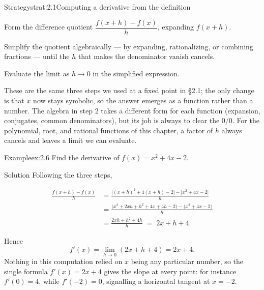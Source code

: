 \documentclass[a4paper,12pt,oneside]{memoir}
\begin{document}
\begin{envstrategy}{Strategy}{strat:2.1}{Computing a derivative from the definition}
\begin{steps}
  \item Form the difference quotient \(\dfrac{f(x + h) - f(x)}{h}\), expanding \(f(x + h)\).
  \item Simplify the quotient algebraically — by expanding, rationalizing, or combining fractions — until the \(h\) that makes the denominator vanish cancels.
  \item Evaluate the limit as \(h \to 0\) in the simplified expression.
\end{steps}
These are the same three steps we used at a fixed point in §2.1; the only change is that \(x\) now stays symbolic, so the answer emerges as a function rather than a number. The algebra in step 2 takes a different form for each function (expansion, conjugates, common denominators), but its job is always to clear the \(0/0\). For the polynomial, root, and rational functions of this chapter, a factor of \(h\) always cancels and leaves a limit we can evaluate.
\end{envstrategy}
\begin{workedexample}
\begin{envexample}{Example}{ex:2.6}{}
Find the derivative of \(f(x) = x^{2} + 4x - 2\).
\end{envexample}
\begin{envsolution}{Solution}{}{}
Following the three steps,

\[ \begin{aligned}
          \frac{f(x + h) - f(x)}{h}
            &= \frac{\bigl[(x + h)^{2} + 4(x + h) - 2\bigr] - \bigl[x^{2} + 4x - 2\bigr]}{h} \\[2pt]
            &= \frac{\bigl(x^{2} + 2xh + h^{2} + 4x + 4h - 2\bigr) - \bigl(x^{2} + 4x - 2\bigr)}{h} \\[2pt]
            &= \frac{2xh + h^{2} + 4h}{h} \;=\; 2x + h + 4.
        \end{aligned} \]

Hence \[ f'(x) = \lim_{h \to 0} (2x + h + 4) = 2x + 4. \] Nothing in this computation relied on \(x\) being any particular number, so the single formula \(f'(x) = 2x + 4\) gives the slope at every point: for instance \(f'(0) = 4\), while \(f'(-2) = 0\), signalling a horizontal tangent at \(x = -2\).
\end{envsolution}
\end{workedexample}
\end{document}
